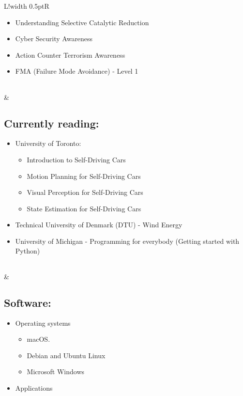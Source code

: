 \documentclass[a4paper]{article}
\newcommand\VRule{\color{lightgray}\vrule width 0.5pt}
\begin{document}
\begin{tabularx}{\textwidth}{L!{\VRule}R}
\begin{itemize}
\begin{itemize}
        \item Understanding Selective Catalytic Reduction
        \item Cyber Security Awareness
        \item Action Counter Terrorism Awareness
        \item FMA (Failure Mode Avoidance) - Level 1
        \end{itemize}
    \end{itemize} \\
    &\subsection{Currently reading:}
    \begin{itemize}
        \item University of Toronto:
        \begin{itemize}
            \item Introduction to Self-Driving Cars
            \item Motion Planning for Self-Driving Cars
            \item Visual Perception for Self-Driving Cars
            \item State Estimation for Self-Driving Cars
        \end{itemize}
        \item Technical University of Denmark (DTU) - Wind Energy
        \item University of Michigan - Programming for everybody (Getting started with Python)
\end{itemize} \\    
    &\subsection{Software:}
    \begin{itemize}
        \item Operating systems
        \begin{itemize}
            \item macOS.
            \item Debian and Ubuntu Linux
            \item Microsoft Windows
        \end{itemize}
        \item Applications
        \begin{itemize}

\end{itemize}
\end{itemize}
\end{tabularx}
\end{document}
